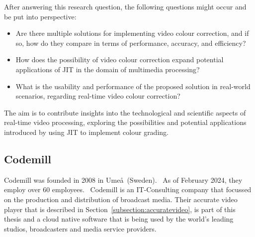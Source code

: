\documentclass[12pt,a4paper]{article}
\begin{document}
After answering this research question, the following questions might occur and be put into perspective:

\begin{itemize}
	\item Are there multiple solutions for implementing video colour correction, and if so, how do they compare in terms of performance, accuracy, and efficiency?
	\item How does the possibility of video colour correction expand potential applications of JIT in the domain of multimedia processing?
	\item What is the usability and performance of the proposed solution in real-world scenarios, regarding real-time video colour correction?
\end{itemize}

The aim is to contribute insights into the technological and scientific aspects of real-time video processing, exploring the possibilities and potential applications introduced by using JIT to implement colour grading. 







\subsection{Codemill} \label{subsection:codemill}

Codemill was founded in 2008 in Ume\aa \ (Sweden).~\cite{codemill_old, codemill_now, codemill_linkedin} 
As of February 2024, they employ over 60 employees.~\cite{codemill} 
Codemill is an IT-Consulting company that focussed on the production and distribution of broadcast media. Their accurate video player that is described in Section~\ref{subsection:accuratevideo}, is part of this thesis and a cloud native software that is being used by the world's leading studios, broadcasters and media service providers.~\cite{codemill_linkedin, codemill_avp} 













\end{document}
